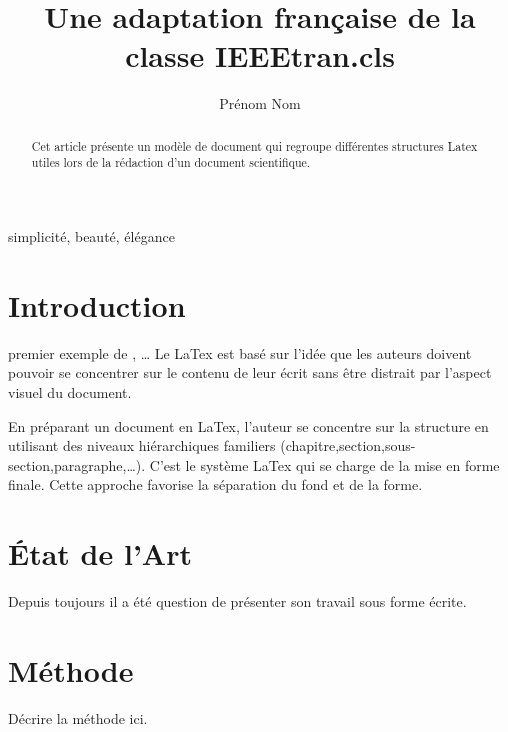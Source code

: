 \documentclass[twocolumn,a4paper]{IEEEtranfr}
\begin{document}
\title{Une adaptation française de la classe IEEEtran.cls}


\author{Prénom Nom %
}
\maketitle

\begin{abstract}
Cet article présente un modèle de document qui regroupe
différentes structures Latex utiles lors de la rédaction d'un 
document scientifique. 
\end{abstract}

\begin{keywords}
simplicité, beauté, élégance
\end{keywords}



\section{Introduction}

 premier exemple de \cite{akgu07},\cite{akgu091}\cite{zwic00} \ldots
Le LaTex est basé sur l'idée que les auteurs doivent pouvoir se concentrer sur
le contenu de leur écrit sans être distrait par l'aspect visuel du document. 

En préparant un document en LaTex, l'auteur se concentre sur la structure en
utilisant des niveaux hiérarchiques familiers
(chapitre,section,sous-section,paragraphe,\ldots). C'est le système LaTex qui
se charge de la mise en forme finale. Cette approche favorise la séparation du
fond et de la forme. 


\section{État de l'Art} 

Depuis toujours il a été question de présenter son travail sous forme écrite.

\section{Méthode}

Décrire la méthode ici.
\end{document}
